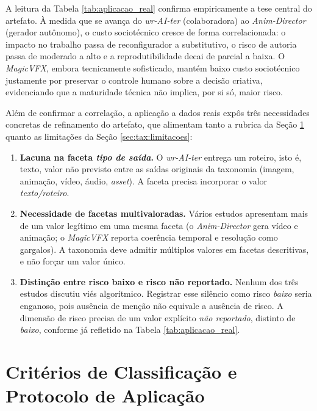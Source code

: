 A leitura da Tabela \ref{tab:aplicacao_real} confirma empiricamente a tese central do artefato. À medida que se avança do \textit{wr-AI-ter} (colaboradora) ao \textit{Anim-Director} (gerador autônomo), o custo sociotécnico cresce de forma correlacionada: o impacto no trabalho passa de reconfigurador a substitutivo, o risco de autoria passa de moderado a alto e a reprodutibilidade decai de parcial a baixa. O \textit{MagicVFX}, embora tecnicamente sofisticado, mantém baixo custo sociotécnico justamente por preservar o controle humano sobre a decisão criativa, evidenciando que a maturidade técnica não implica, por si só, maior risco.

Além de confirmar a correlação, a aplicação a dados reais expôs três necessidades concretas de refinamento do artefato, que alimentam tanto a rubrica da Seção \ref{sec:tax:rubrica} quanto as limitações da Seção \ref{sec:tax:limitacoes}:

\begin{enumerate}
    \item \textbf{Lacuna na faceta \textit{tipo de saída}.} O \textit{wr-AI-ter} entrega um roteiro, isto é, texto, valor não previsto entre as saídas originais da taxonomia (imagem, animação, vídeo, áudio, \textit{asset}). A faceta precisa incorporar o valor \textit{texto/roteiro}.
    \item \textbf{Necessidade de facetas multivaloradas.} Vários estudos apresentam mais de um valor legítimo em uma mesma faceta (o \textit{Anim-Director} gera vídeo e animação; o \textit{MagicVFX} reporta coerência temporal e resolução como gargalos). A taxonomia deve admitir múltiplos valores em facetas descritivas, e não forçar um valor único.
    \item \textbf{Distinção entre risco baixo e risco não reportado.} Nenhum dos três estudos discutiu viés algorítmico. Registrar esse silêncio como risco \textit{baixo} seria enganoso, pois ausência de menção não equivale a ausência de risco. A dimensão de risco precisa de um valor explícito \textit{não reportado}, distinto de \textit{baixo}, conforme já refletido na Tabela \ref{tab:aplicacao_real}.
\end{enumerate}

\section{Critérios de Classificação e Protocolo de Aplicação}
\label{sec:tax:rubrica}

